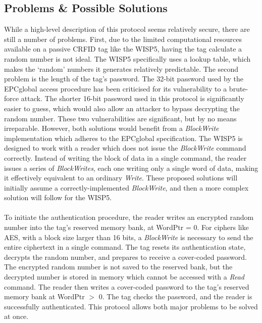 \documentclass[journal]{IEEEtran}
\begin{document}
    \subsection{Problems \& Possible Solutions}
        While a high-level description of this protocol seems relatively secure, there are still a number of problems.
        First, due to the limited computational resources available on a passive CRFID tag like the WISP5, having the tag calculate a random number is not ideal.
        The WISP5 specifically uses a lookup table, which makes the `random' numbers it generates relatively predictable.
        The second problem is the length of the tag's password.
        The 32-bit password used by the EPCglobal access procedure has been criticised\cite{smartcard} for its vulnerability to a brute-force attack.
        The shorter 16-bit password used in this protocol is significantly easier to guess, which would also allow an attacker to bypass decrypting the random number.
        These two vulnerabilities are significant, but by no means irreparable.
        However, both solutions would benefit from a \textit{BlockWrite} implementation which adheres to the EPCglobal specification.
        The WISP5 is designed to work with a reader which does not issue the \textit{BlockWrite} command correctly.
        Instead of writing the block of data in a single command, the reader issues a series of \textit{BlockWrites}, each one writing only a single word of data, making it effectively equivalent to an ordinary \textit{Write}.
        These proposed solutions will initially assume a correctly-implemented \textit{BlockWrite}, and then a more complex solution will follow for the WISP5.
        \\\\
        To initiate the authentication procedure, the reader writes an encrypted random number into the tag's reserved memory bank, at WordPtr = 0.
        For ciphers like AES, with a block size larger than 16 bits, a \textit{BlockWrite} is necessary to send the entire ciphertext in a single command.
        The tag resets its authentication state, decrypts the random number, and prepares to receive a cover-coded password.
        The encrypted random number is not saved to the reserved bank, but the decrypted number is stored in memory which cannot be accessed with a \textit{Read} command.
        The reader then writes a cover-coded password to the tag's reserved memory bank at WordPtr $>$ 0.
        The tag checks the password, and the reader is successfully authenticated.
        This protocol allows both major problems to be solved at once.
\end{document}
